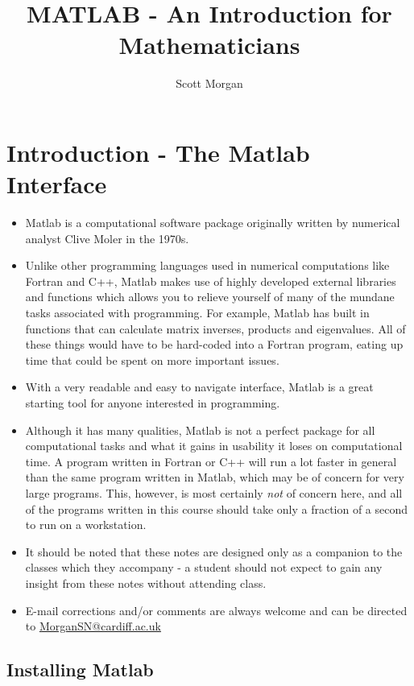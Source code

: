 \documentclass[12pt]{report}
\title{MATLAB - An Introduction for Mathematicians}
\author{Scott Morgan}
\begin{document}
\maketitle

\section*{Introduction - The Matlab Interface}

\begin{itemize}
\item Matlab is a computational software package originally written by numerical analyst Clive Moler in the 1970s. 
\item Unlike other programming languages used in numerical computations like Fortran and C++, Matlab makes use of highly developed external libraries and functions which allows you to relieve yourself of many of the mundane tasks associated with programming. For example, Matlab has built in functions that can calculate matrix inverses, products and eigenvalues. All of these things would have to be hard-coded into a Fortran program, eating up time that could be spent on more important issues. 
\item With a very readable and easy to navigate interface, Matlab is a great starting tool for anyone interested in programming. 
\item Although it has many qualities, Matlab is not a perfect package for all computational tasks and what it gains in usability it loses on computational time. A program written in Fortran or C++ will run a lot faster in general than the same program written in Matlab, which may be of concern for very large programs. This, however, is most certainly \textit{not} of concern here, and all of the programs written in this course should take only a fraction of a second to run on a workstation.
\item It should be noted that these notes are designed only as a companion to the classes which they accompany - a student should not expect to gain any insight from these notes without attending class.
\item E-mail corrections and/or comments are always welcome and can be directed to \url{MorganSN@cardiff.ac.uk}
\end{itemize}


\subsection*{Installing Matlab}
\end{document}

